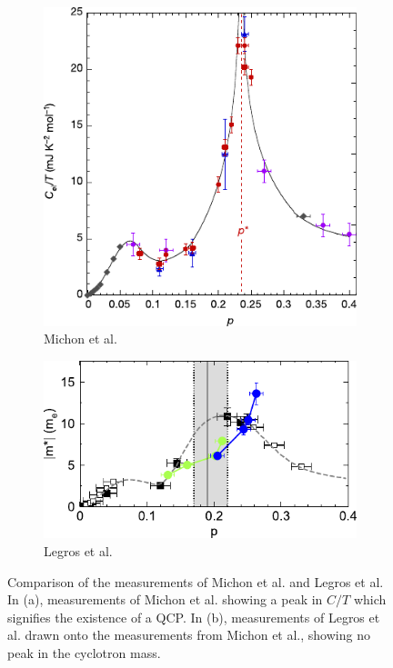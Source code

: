 \begin{figure}
    \centering
    \begin{subfigure}{0.48\textwidth}
        \centering
        \includegraphics[width=\textwidth]{figures/michon}
        \caption{Michon et al.\cite{michon2019}}
        \label{fig:michon}
    \end{subfigure}\hfill
    \begin{subfigure}{0.48\textwidth}
        \centering
        \includegraphics[width=\textwidth]{figures/legros}
        \caption{Legros et al.\cite{legros2022}}
        \label{fig:legros}
    \end{subfigure}
    \caption{Comparison of the measurements of Michon et al.\cite{michon2019} and Legros et al.\cite{legros2022} In (a), measurements
    of Michon et al. showing a peak in $C/T$ which signifies the existence of a QCP. In (b),
    measurements of Legros et al. drawn onto the measurements from Michon et al.,
    showing no peak in the cyclotron mass.}
    \label{fig:comparison}
\end{figure}

